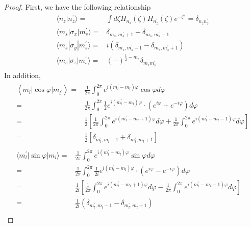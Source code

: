   \begin{proof}
    First, we have the following relationship
    \begin{align}
      \langle n_z | n_z^{\prime} \rangle =& \int d\zeta H_{n_z}(\zeta) H_{n_z^{\prime}}(\zeta) e^{-\zeta^2} = \delta_{n_z n_z^{\prime}}\\
      \langle m_s | \sigma_x | m_s^{\prime} \rangle =& \delta_{m_s,m_s^{\prime}+1} + \delta_{m_s,m_s^{\prime}-1}\\
      \langle m_s | \sigma_y | m_s^{\prime} \rangle =& i(\delta_{m_s,m_s^{\prime}-1} - \delta_{m_s,m_s^{\prime}+1})\\
      \langle m_s | \sigma_z | m_s^{\prime} \rangle =& (-)^{\frac{1}{2} - m_s}\delta_{m_s m_s^{\prime}}\\
    \end{align}
    In addition,
    \begin{align}
      \begin{aligned}
      \left\langle m_{l}|\cos \varphi| m_{l^{\prime}}\right\rangle=&\frac{1}{2 \pi} \int_{0}^{2 \pi} e^{i(m_l^{\prime} - m_l) \varphi} \cos \varphi d \varphi\\
      =&\frac{1}{2 \pi} \int_{0}^{2 \pi} \frac{1}{2} e^{i(m_l^{\prime} - m_l) \varphi} \cdot\left(e^{i \varphi}+e^{-i \varphi}\right) d \varphi\\
      =&\frac{1}{2}\left[\frac{1}{2 \pi} \int_{0}^{2 \pi} e^{i(m_l^{\prime} - m_l +1) \varphi} d \varphi+\frac{1}{2 \pi} \int_{0}^{2 \pi} e^{i(m_l^{\prime} - m_l - 1) \varphi} d \varphi\right]\\
      =&\frac{1}{2}\left[\delta_{m_{l}^{\prime},m_{l}-1}+\delta_{m_{l}^{\prime},m_{l}+1}\right]
      \end{aligned} \\
      \begin{aligned}
        \langle m_{l}^{\prime}|\sin \varphi| m_{l}\rangle =& \frac{1}{2 \pi} \int_{0}^{2 \pi} e^{i(m_l^{\prime} - m_l) \varphi} \sin \varphi d \varphi\\
        =&\frac{1}{2 \pi} \int_{0}^{2 \pi} \frac{1}{2 i} e^{i(m_l^{\prime} - m_l) \varphi} \cdot (e^{i \varphi}-e^{-i \varphi} ) d \varphi \\
        =&\frac{1}{2 i} \left[ \frac{1}{2 \pi} \int_{0}^{2 \pi} e^{ i(m_l^{\prime} - m_l +1) \varphi} d \varphi-\frac{1}{2 \pi} \int_{0}^{2 \pi} e^{i (m_l^{\prime} - m_l -1) \varphi} d \varphi \right] \\
        =&\frac{1}{2 i} (\delta_{m_{l}^{\prime},m_{l}-1}-\delta _{m_{l}^{\prime},m_{l}+1} ) \\

\end{aligned}
\end{align}
\end{proof}
